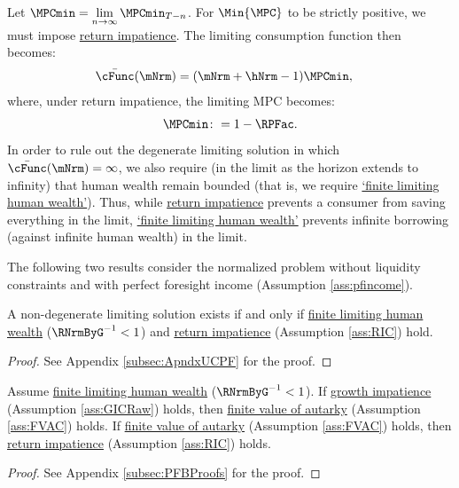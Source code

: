 \documentclass[BufferStockTheory]{subfiles}
\begin{document}
Let $\MPCmin = \lim\limits_{n\rightarrow\infty}\MPCmin_{T-n}$.
For $\Min{\MPC}$ to be strictly positive, we must impose \hyperlink{RIC}{return impatience}.
The limiting consumption function then becomes:
%
\begin{equation}\begin{gathered}\begin{aligned}\label{eq:cFuncPFUnc}
  \bar{\cFunc}(\mNrm)  & = (\mNrm+\hNrm-1)\MPCmin,
\end{aligned}\end{gathered}\end{equation}
%
where, under return impatience, the limiting MPC becomes:
%
%
\begin{equation}\label{eq:MPCminDef}
\MPCmin \colon = 1-\RPFac.
\end{equation}
%
%
%
In order to rule out the degenerate limiting solution in which $\bar{\cFunc}(\mNrm) = \infty$, we also require (in the limit as the horizon extends to infinity) that human wealth remain bounded (that is, we require \hyperlink{FHWC}{`finite limiting human wealth'}).
Thus, while \hyperlink{RIC}{return impatience} prevents a consumer from saving everything in the limit,  \hyperlink{FHWC}{`finite limiting  human wealth'} prevents infinite borrowing (against infinite human wealth) in the limit.

The following two results consider the normalized problem without liquidity constraints and with perfect foresight income (Assumption \ref{ass:pfincome}).

\begin{proposition}\label{prop:pfUCFHWC}
 A non-degenerate limiting solution exists if and only if \hyperlink{FHWC}{finite limiting  human wealth} ($\RNrmByG^{-1}<1$) and \hyperlink{RIC}{return impatience} (Assumption \ref{ass:RIC}) hold. 
\end{proposition}
\begin{proof}\let\qed\relax
  See Appendix \ref{subsec:ApndxUCPF} for the proof.

\end{proof}
  

\begin{claim}\label{claim:PFConspC}
Assume \hyperlink{FHWC}{finite limiting human wealth} ($\RNrmByG^{-1}<1$). If \hyperlink{GIC}{growth impatience} (Assumption \ref{ass:GICRaw}) holds, then \hyperlink{FVAC}{finite value of autarky} (Assumption \ref{ass:FVAC}) holds. If \hyperlink{FVAC}{finite value of autarky} (Assumption \ref{ass:FVAC}) holds, then \hyperlink{RIC}{return impatience} (Assumption \ref{ass:RIC}) holds. 
\end{claim}
\begin{proof}\let\qed\relax
See Appendix \ref{subsec:PFBProofs} for the proof.
\end{proof}
\end{document}
